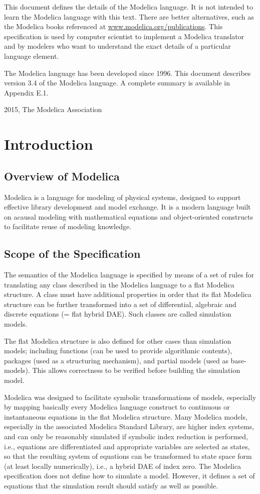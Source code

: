 \documentclass[10pt,a4paper]{report}
\begin{document}
This document defines the details of the Modelica language. It is not
intended to learn the Modelica language with this text. There are better
alternatives, such as the Modelica books referenced at
\href{http://www.modelica.org/publications}{www.modelica.org/publications}.
This specification is used by computer scientist to implement a Modelica
translator and by modelers who want to understand the exact details of a
particular language element.

The Modelica language has been developed since 1996. This document
describes version 3.4 of the Modelica language. A complete summary is
available in Appendix E.1.

2015, The Modelica Association

\chapter{Introduction}
\section{Overview of Modelica}
Modelica is a language for modeling of physical systems, designed to
support effective library development and model exchange. It is a modern
language built on acausal modeling with mathematical equations and
object-oriented constructs to facilitate reuse of modeling knowledge.

\section{Scope of the Specification}

The semantics of the Modelica language is specified by means of a set of
rules for translating any class described in the Modelica language to a
flat Modelica structure. A class must have additional properties in
order that its flat Modelica structure can be further transformed into a
set of differential, algebraic and discrete equations (= flat hybrid
DAE). Such classes are called simulation models.

The flat Modelica structure is also defined for other cases than
simulation models; including functions (can be used to provide
algorithmic contents), packages (used as a structuring mechanism), and
partial models (used as base-models). This allows correctness to be
verified before building the simulation model.

Modelica was designed to facilitate symbolic transformations of models,
especially by mapping basically every Modelica language construct to
continuous or instantaneous equations in the flat Modelica structure.
Many Modelica models, especially in the associated Modelica Standard
Library, are higher index systems, and can only be reasonably simulated
if symbolic index reduction is performed, i.e., equations are
differentiated and appropriate variables are selected as states, so that
the resulting system of equations can be transformed to state space form
(at least locally numerically), i.e., a hybrid DAE of index zero. The
Modelica specification does not define how to simulate a model. However,
it defines a set of equations that the simulation result should satisfy
as well as possible.
\end{document}
